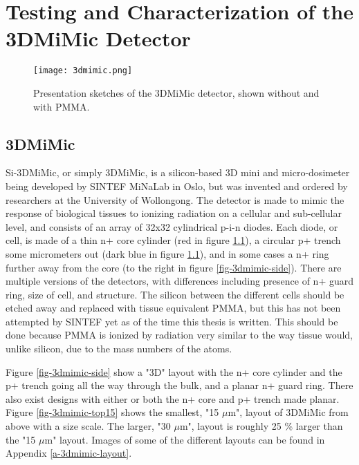 \documentclass[../main/thesis.tex]{subfiles}
\begin{document}
\newpage
\chapter{Testing and Characterization of the 3DMiMic Detector}
\label{3dmimic}

\begin{figure}[h]
	\centering
	\texttt{[image: 3dmimic.png]}
	\caption{Presentation sketches of the 3DMiMic detector, shown without and with PMMA. \citep{Trento2015}}
	\label{fig-3dmimic}
\end{figure}

\section{3DMiMic}
\label{3d-3d}
Si-3DMiMic, or simply 3DMiMic, is a silicon-based 3D mini and micro-dosimeter being developed by SINTEF MiNaLab in Oslo, but was invented and ordered by researchers at the University of Wollongong. The detector is made to mimic the response of biological tissues to ionizing radiation on a cellular and sub-cellular level, and consists of an array of 32x32 cylindrical p-i-n diodes. Each diode, or cell, is made of a thin n+ core cylinder (red in figure \ref{fig-3dmimic}), a circular p+ trench some micrometers out (dark blue in figure \ref{fig-3dmimic}), and in some cases a n+ ring further away from the core (to the right in figure \ref{fig-3dmimic-side}). There are multiple versions of the detectors, with differences including presence of n+ guard ring, size of cell, and structure. The silicon between the different cells should be etched away and replaced with tissue equivalent \gls{PMMA}, but this has not been attempted by SINTEF yet as of the time this thesis is written. This should be done because \gls{PMMA} is ionized by radiation very similar to the way tissue would, unlike silicon, due to the mass numbers of the atoms. 


Figure \ref{fig-3dmimic-side} show a "3D" layout with the n+ core cylinder and the p+ trench going all the way through the bulk, and a planar n+ guard ring. There also exist designs with either or both the n+ core and p+ trench made planar. Figure \ref{fig-3dmimic-top15} shows the smallest, "15 $\mu$m", layout of 3DMiMic from above with a size scale. The larger, "30 $\mu$m", layout is roughly 25 \% larger than the "15 $\mu$m" layout. Images of some of the different layouts can be found in Appendix \ref{a-3dmimic-layout}.
\end{document}
